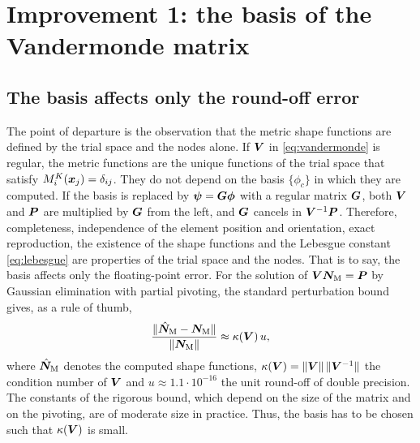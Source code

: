 \section{Improvement 1: the basis of the Vandermonde matrix}
\label{sec:basis}
%
\subsection{The basis affects only the round-off error}
\label{sec:basis-invariance}
%
The point of departure is the observation that the metric shape functions are defined by the trial space and the nodes alone. If $\bm{V}$ in \cref{eq:vandermonde} is regular, the metric functions are the unique functions of the trial space that satisfy $M_i^K(\bm{x}_j)=\delta_{ij}$. They do not depend on the basis $\{\phi_c\}$ in which they are computed. If the basis is replaced by $\bm\psi=\bm{G}\bm\phi$ with a regular matrix $\bm{G}$, both $\bm{V}$ and $\bm{P}$ are multiplied by $\bm{G}$ from the left, and $\bm{G}$ cancels in $\bm{V}^{-1}\bm{P}$. Therefore, completeness, independence of the element position and orientation, exact reproduction, the existence of the shape functions and the Lebesgue constant \cref{eq:lebesgue} are properties of the trial space and the nodes. That is to say, the basis affects only the floating-point error. For the solution of $\bm{V}\bm{N}_{\mathrm M}=\bm{P}$ by Gaussian elimination with partial pivoting, the standard perturbation bound~\cite{Higham2002Accuracy} gives, as a rule of thumb,
%
\begin{equation}
  \frac{\|\hat{\bm{N}}_{\mathrm M}-\bm{N}_{\mathrm M}\|}{\|\bm{N}_{\mathrm M}\|}\approx\kappa(\bm{V})\,u ,
  \label{eq:fp}
\end{equation}
%
where $\hat{\bm{N}}_{\mathrm M}$ denotes the computed shape functions, $\kappa(\bm{V})=\|\bm{V}\|\,\|\bm{V}^{-1}\|$ the condition number of $\bm{V}$ and $u\approx1.1\cdot10^{-16}$ the unit round-off of double precision. The constants of the rigorous bound, which depend on the size of the matrix and on the pivoting, are of moderate size in practice. Thus, the basis has to be chosen such that $\kappa(\bm{V})$ is small.
%
